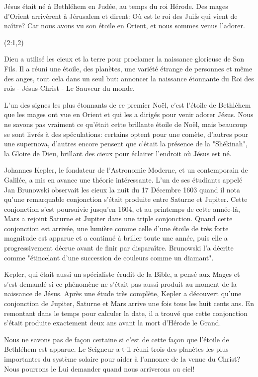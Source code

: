 

\epigraph{%
Jésus était né à Bethléhem en Judée, au temps du roi Hérode. Des mages d’Orient arrivèrent à Jérusalem et dirent: Où est le roi des Juifs qui vient de naître? Car nous avons vu son étoile en Orient, et nous sommes venus l’adorer.}{(2:1,2)}

Dieu a utilisé les cieux et la terre pour proclamer la naissance glorieuse de Son Fils. Il a réuni une étoile, des planètes, une variété étrange de personnes et même des anges, tout cela dans un seul but: annoncer la naissance étonnante du Roi des rois - Jésus-Christ - Le Sauveur du monde.

L'un des signes les plus étonnants de ce premier Noël, c'est l'étoile de Bethléhem que les mages ont vue en Orient et qui les a dirigés pour venir adorer Jésus. Nous ne savons pas vraiment ce qu'était cette brillante étoile de Noël, mais beaucoup se sont livrés à des spéculations: certains optent pour une comète, d'autres pour une supernova, d'autres encore pensent que c'était la présence de la "Shékinah", la Gloire de Dieu, brillant des cieux pour éclairer l'endroit où Jésus est né.

Johannes Kepler, le fondateur de l'Astronomie Moderne, et un contemporain de Galilée, a mis en avance une théorie intéressante. L'un de ses étudiants appelé Jan Brunowski observait les cieux la nuit du 17 Décembre 1603 quand il nota qu'une remarquable conjonction s'était produite entre Saturne et Jupiter. Cette conjonction s'est poursuivie jusqu'en 1604, et au printemps de cette année-là, Mars a rejoint Saturne et Jupiter dans une triple conjonction. Quand cette conjonction est arrivée, une lumière comme celle d'une étoile de très forte magnitude est apparue et a continué à briller toute une année, puis elle a progressivement décrue avant de finir par disparaître. Brunowski l'a décrite comme "étincelant d'une succession de couleurs comme un diamant".

Kepler, qui était aussi un spécialiste érudit de la Bible, a pensé aux Mages et s'est demandé si ce phénomène ne s'était pas aussi produit au moment de la naissance de Jésus. Après une étude très complète, Kepler a découvert qu'une conjonction de Jupiter, Saturne et Mars arrive une fois tous les huit cents ans. En remontant dans le temps pour calculer la date, il a trouvé que cette conjonction s'était produite exactement deux ans avant la mort d'Hérode le Grand.

Nous ne savons pas de façon certaine si c'est de cette façon que l'étoile de Bethléhem est apparue. Le Seigneur a-t-il réuni trois des planètes les plus importantes du système solaire pour aider à l'annonce de la venue du Christ? Nous pourrons le Lui demander quand nous arriverons au ciel!



